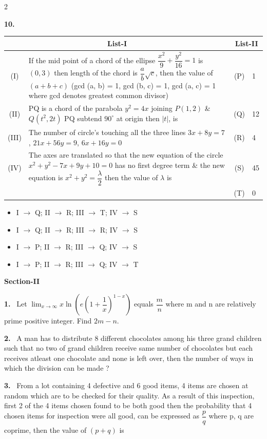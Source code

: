 \documentclass[10pt]{extarticle}
\newcommand{\sect}[1]{\par\smallskip\noindent\textbf{#1}\par}
\newcommand{\qn}[1]{\par\smallskip\noindent\textbf{#1.}~}
\newenvironment{qoptions}{\begin{itemize}[leftmargin=1.8em,itemsep=1pt,topsep=2pt,label={}]}{\end{itemize}}
\newcommand{\opt}[2]{\item[(#1)] #2}
\begin{document}
\begin{multicols}{2}
\qn{10}\par\nobreak
\begin{center}\small\setlength{\tabcolsep}{3pt}
\begin{tabular}{|c|p{4.0cm}|c|p{0.7cm}|}
\hline
\multicolumn{2}{|c|}{\textbf{List-I}} & \multicolumn{2}{c|}{\textbf{List-II}} \\
\hline
(I) & If the mid point of a chord of the ellipse $\dfrac{x^2}9+\dfrac{y^2}{16}=1$ is $(0,3)$ then length of the chord is $\dfrac ab\sqrt c$, then the value of $(a+b+c)$ (gcd (a, b) = 1, gcd (b, c) = 1, gcd (a, c) = 1 where gcd denotes greatest common divisor) & (P) & 1 \\
\hline
(II) & PQ is a chord of the parabola $y^2=4x$ joining $P(1,2)$ \& $Q(t^2,2t)$ PQ subtend $90^\circ$ at origin then $|t|$, is & (Q) & 12 \\
\hline
(III) & The number of circle's touching all the three lines $3x+8y=7$, $21x+56y=9$, $6x+16y=0$ & (R) & 4 \\
\hline
(IV) & The axes are translated so that the new equation of the circle $x^2+y^2-7x+9y+10=0$ has no first degree term \& the new equation is $x^2+y^2=\dfrac\lambda2$ then the value of $\lambda$ is & (S) & 45 \\
\hline
 & & (T) & 0 \\
\hline
\end{tabular}
\end{center}
\begin{qoptions}
\opt{A}{I $\to$ Q; II $\to$ R; III $\to$ T; IV $\to$ S}
\opt{B}{I $\to$ Q; II $\to$ R; III $\to$ R; IV $\to$ S}
\opt{C}{I $\to$ P; II $\to$ R; III $\to$ Q; IV $\to$ S}
\opt{D}{I $\to$ P; II $\to$ R; III $\to$ Q; IV $\to$ T}
\end{qoptions}

\sect{Section-II}

\qn{1} Let $\displaystyle\lim_{x\to\infty}x\ln\left(e\left(1+\dfrac1x\right)^{1-x}\right)$ equals $\dfrac mn$ where m and n are relatively prime positive integer. Find $2m-n$.

\qn{2} A man has to distribute 8 different chocolates among his three grand children such that no two of grand children receive same number of chocolates but each receives atleast one chocolate and none is left over, then the number of ways in which the division can be made ?

\qn{3} From a lot containing 4 defective and 6 good items, 4 items are chosen at random which are to be checked for their quality. As a result of this inspection, first 2 of the 4 items chosen found to be both good then the probability that 4 chosen items for inspection were all good, can be expressed as $\dfrac pq$ where p, q are coprime, then the value of $(p+q)$ is


\end{multicols}
\end{document}
